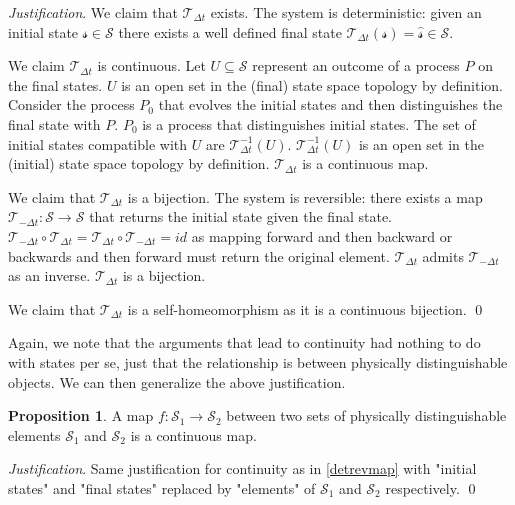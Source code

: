 \documentclass[aps,pra,10pt,twocolumn,floatfix,nofootinbib]{revtex4-1}
\numberwithin{equation}{section}
\theoremstyle{definition}
\newtheorem{prop}[equation]{Proposition}
\newenvironment{justification}{\emph{Justification}.}{\qed}
\begin{document}
\begin{justification}
We claim that $\mathcal{T}_{\Delta t}$ exists. The system is deterministic: given an initial state $\mathcal{s} \in \mathcal{S}$ there exists a well defined final state $\mathcal{T}_{\Delta t}(\mathcal{s})=\hat{\mathcal{s}} \in \mathcal{S}$.

We claim $\mathcal{T}_{\Delta t}$ is continuous. Let $U \subseteq \mathcal{S}$ represent an outcome of a process $P$ on the final states. $U$ is an open set in the (final) state space topology by definition. Consider the process $P_0$ that evolves the initial states and then distinguishes the final state with $P$. $P_0$ is a process that distinguishes initial states. The set of initial states compatible with $U$ are $\mathcal{T}_{\Delta t}^{-1}(U)$. $\mathcal{T}_{\Delta t}^{-1}(U)$ is an open set in the (initial) state space topology by definition. $\mathcal{T}_{\Delta t}$ is a continuous map.

We claim that $\mathcal{T}_{\Delta t}$ is a bijection. The system is reversible: there exists a map $\mathcal{T}_{-\Delta t}:\mathcal{S} \rightarrow \mathcal{S}$ that returns the initial state given the final state. $\mathcal{T}_{-\Delta t} \circ \mathcal{T}_{\Delta t} = \mathcal{T}_{\Delta t} \circ \mathcal{T}_{-\Delta t} = id$ as mapping forward and then backward or backwards and then forward must return the original element. $\mathcal{T}_{\Delta t}$ admits $\mathcal{T}_{-\Delta t}$ as an inverse. $\mathcal{T}_{\Delta t}$ is a bijection.

We claim that $\mathcal{T}_{\Delta t}$ is a self-homeomorphism as it is a continuous bijection.
\end{justification}

Again, we note that the arguments that lead to continuity had nothing to do with states per se, just that the relationship is between physically distinguishable objects. We can then generalize the above justification.

\begin{prop}\label{continuous_map}
	A map $f:\mathcal{S_1} \rightarrow \mathcal{S_2}$ between two sets of physically distinguishable elements $\mathcal{S_1}$ and $\mathcal{S_2}$ is a continuous map.
\end{prop}

\begin{justification}
	Same justification for continuity as in \ref{detrevmap} with "initial states" and "final states" replaced by "elements" of $\mathcal{S_1}$ and $\mathcal{S_2}$ respectively.
\end{justification}
\end{document}
